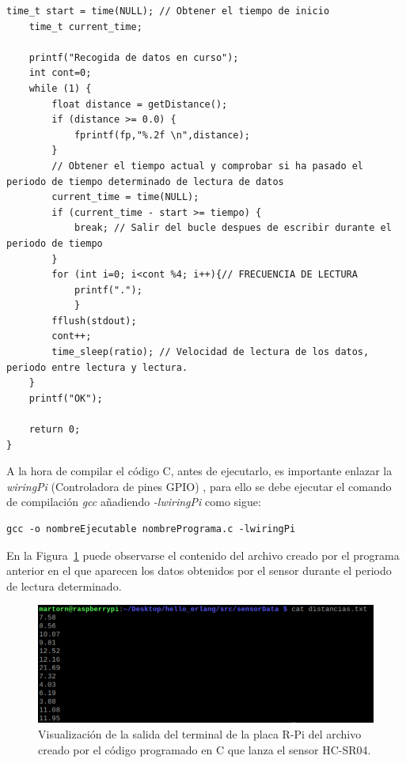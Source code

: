 \begin{lstlisting}[frame=single]
    time_t start = time(NULL); // Obtener el tiempo de inicio
    time_t current_time;

    printf("Recogida de datos en curso");
    int cont=0;
    while (1) {
        float distance = getDistance();
        if (distance >= 0.0) {
            fprintf(fp,"%.2f \n",distance);
        }
        // Obtener el tiempo actual y comprobar si ha pasado el periodo de tiempo determinado de lectura de datos
        current_time = time(NULL);
        if (current_time - start >= tiempo) {
            break; // Salir del bucle despues de escribir durante el periodo de tiempo
        }
        for (int i=0; i<cont %4; i++){// FRECUENCIA DE LECTURA
            printf(".");
            }
        fflush(stdout);
        cont++;
        time_sleep(ratio); // Velocidad de lectura de los datos, periodo entre lectura y lectura.
    }
    printf("OK");

    return 0;
}
\end{lstlisting}

A la hora de compilar el código C, antes de ejecutarlo, es importante enlazar la \textit{wiringPi} (Controladora de pines GPIO) , para ello se debe ejecutar el comando de compilación \textit{gcc} añadiendo \textit{-lwiringPi}  como sigue:\\
\begin{lstlisting}[style=terminal]
gcc -o nombreEjecutable nombrePrograma.c -lwiringPi
\end{lstlisting}

En la Figura~\ref{fig:salidaUltrasonidoC} puede observarse el contenido del archivo creado por el programa anterior en el que aparecen los datos obtenidos por el sensor durante el periodo de lectura determinado.

\begin{figure}[h]
\centering
\includegraphics[scale=0.8]{images/salidaUltrasonidoC.png}
\caption[Salida de terminal del código C del sensor HC-SR04]{Visualización de la salida del terminal de la placa R-Pi del archivo creado por el código programado en C que lanza el sensor HC-SR04.}%
\label{fig:salidaUltrasonidoC}
\end{figure}


